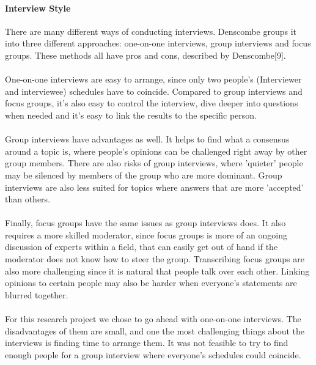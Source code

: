 \documentclass{article}
\begin{document}
\paragraph{Interview Style}
There are many different ways of conducting interviews. Denscombe groups it into
three different approaches: one-on-one interviews, group interviews and focus groups.
These methods all have pros and cons, described by Denscombe[9].
\\ \\
One-on-one interviews are easy to arrange, since
only two people's (Interviewer and interviewee) schedules have to coincide.
Compared to group interviews and focus groups, it's also easy to control the interview,
dive deeper into questions when needed and it's easy to link the results
to the specific person.
\\ \\
Group interviews have advantages as well. It helps to find what a consensus around
a topic is, where people's opinions can be challenged right away by other group members.
There are also risks of group interviews, where 'quieter' people may be silenced by
members of the group who are more dominant. Group interviews are also less suited
for topics where answers that are more 'accepted' than others.
\\ \\
Finally, focus groups have the same issues as group interviews does. It also
requires a more skilled moderator, since focus groups is more of an ongoing
discussion of experts within a field, that can easily get out of hand if the
moderator does not know how to steer the group.  Transcribing focus groups are also
more challenging since it is natural that people talk over each other. Linking opinions
to certain people may also be harder when everyone's statements are blurred together.
\\ \\
For this research project we chose to go ahead with one-on-one interviews.
The disadvantages of them are small, and one the most challenging things
about the interviews is finding time to arrange them. It was not feasible
to try to find enough people for a group interview where everyone's schedules
could coincide.
\end{document}
